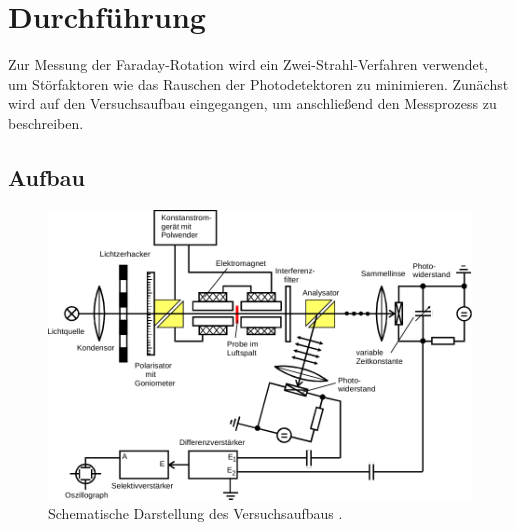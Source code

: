 \section{Durchführung}
\label{sec:durchfuehrung}

Zur Messung der Faraday-Rotation wird ein Zwei-Strahl-Verfahren verwendet,
um Störfaktoren wie das Rauschen der Photodetektoren zu minimieren.
Zunächst wird auf den Versuchsaufbau eingegangen,
um anschließend den Messprozess zu beschreiben.


\subsection{Aufbau}
\label{sec:durchfuehrung:aufbau}
\begin{figure}
    \centering
    \includegraphics[width=\textwidth]{content/img/Abb_1.pdf}
    \caption{Schematische Darstellung des Versuchsaufbaus \cite{versuchsanleitung}.}
    \label{fig:aufbau}
\end{figure}


